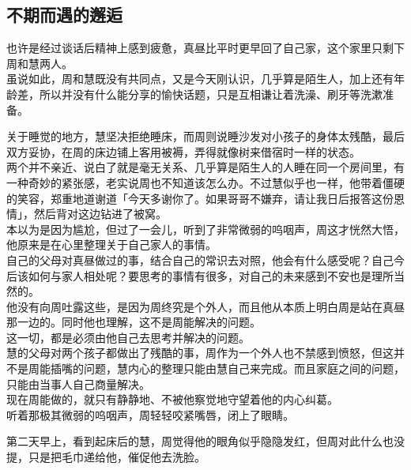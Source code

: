 \subsection{不期而遇的邂逅}

也许是经过谈话后精神上感到疲惫，真昼比平时更早回了自己家，这个家里只剩下周和慧两人。\\

虽说如此，周和慧既没有共同点，又是今天刚认识，几乎算是陌生人，加上还有年龄差，所以并没有什么能分享的愉快话题，只是互相谦让着洗澡、刷牙等洗漱准备。

关于睡觉的地方，慧坚决拒绝睡床，而周则说睡沙发对小孩子的身体太残酷，最后双方妥协，在周的床边铺上客用被褥，弄得就像树来借宿时一样的状态。\\

两个并不亲近、说白了就是毫无关系、几乎算是陌生人的人睡在同一个房间里，有一种奇妙的紧张感，老实说周也不知道该怎么办。不过慧似乎也一样，他带着僵硬的笑容，郑重地道谢道「今天多谢你了。如果哥哥不嫌弃，请让我日后报答这份恩情」，然后背对这边钻进了被窝。\\

本以为是因为尴尬，但过了一会儿，听到了非常微弱的呜咽声，周这才恍然大悟，他原来是在心里整理关于自己家人的事情。\\

自己的父母对真昼做过的事，结合自己的常识去对照，他会有什么感受呢？自己今后该如何与家人相处呢？要思考的事情有很多，对自己的未来感到不安也是理所当然的。\\

他没有向周吐露这些，是因为周终究是个外人，而且他从本质上明白周是站在真昼那一边的。同时他也理解，这不是周能解决的问题。\\

这一切，都是必须由他自己去思考并解决的问题。\\

慧的父母对两个孩子都做出了残酷的事，周作为一个外人也不禁感到愤怒，但这并不是周能插嘴的问题，慧内心的整理只能由慧自己来完成。而且家庭之间的问题，只能由当事人自己商量解决。\\

现在周能做的，就只有静静地、不被他察觉地守望着他的内心纠葛。\\

听着那极其微弱的呜咽声，周轻轻咬紧嘴唇，闭上了眼睛。\\

\vspace{2\baselineskip}

第二天早上，看到起床后的慧，周觉得他的眼角似乎隐隐发红，但周对此什么也没提，只是把毛巾递给他，催促他去洗脸。

